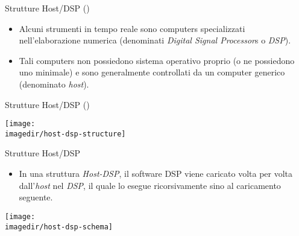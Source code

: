 \setcounter{ms}{1}
\begin{slide}{Strutture Host/DSP ()}
{
		\begin{itemize}
		\setlength{\itemsep}{12mm}

			\item Alcuni strumenti in tempo reale sono
                  computers specializzati nell'elaborazione numerica
                  (denominati \emph{Digital Signal Processor}s
                  o \emph{DSP}).

		    \item Tali computers non possiedono sistema
				  operativo proprio (o ne possiedono uno minimale)
				  e sono generalmente controllati da un
				  computer generico (denominato \emph{host}).

		\end{itemize}
}
\end{slide}

\begin{slide}{Strutture Host/DSP ()}
{
	\begin{center}
		\texttt{[image: \\imagedir/host-dsp-structure]}
	\end{center}
}
\end{slide}

\begin{slide}{Strutture Host/DSP}
{

	\begin{itemize}

		\item In una struttura \emph{Host-DSP},
			  il software DSP viene caricato volta per volta
			  dall'\emph{host} nel \emph{DSP},
			  il quale lo esegue ricorsivamente
			  sino al caricamento seguente.

	\end{itemize}

	\begin{center}
		\texttt{[image: \\imagedir/host-dsp-schema]}
	\end{center}

}
\end{slide}

